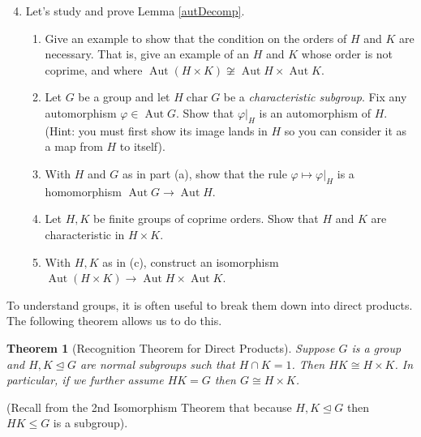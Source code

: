 \documentclass[11pt]{article}
\newtheorem{theorem}{Theorem}
\newcommand{\Aut}{\operatorname{Aut}}
\newcommand{\ch}{\operatorname{char}}
\begin{document}
\begin{enumerate}
  \setcounter{enumi}{3}
  \item{
  Let's study and prove Lemma \ref{autDecomp}.
  \begin{enumerate}
    \item{
    Give an example to show that the condition on the orders of $H$ and $K$ are necessary.  That is, give an example of an $H$ and $K$ whose order is not coprime, and where $\Aut(H\times K)\not\cong \Aut H\times\Aut K$.
    }
    \item{
    Let $G$ be a group and let $H\ch G$ be a \textit{characteristic subgroup}.  Fix any automorphism $\varphi\in\Aut G$. Show that $\varphi|_H$ is an automorphism of $H$.  (Hint: you must first show its image lands in $H$ so you can consider it as a map from $H$ to itself).
    }
    \item{
    With $H$ and $G$ as in part (a), show that the rule $\varphi\mapsto\varphi|_H$ is a homomorphism $\Aut G\to\Aut H$.
    }
    \item{
    Let $H,K$ be finite groups of coprime orders.  Show that $H$ and $K$ are characteristic in $H\times K$.
    }
    \item{
    With $H,K$ as in (c), construct an isomorphism $\Aut(H\times K)\to\Aut H\times\Aut K$.
    }
  \end{enumerate}
  }
\end{enumerate}
To understand groups, it is often useful to break them down into direct products.  The following theorem allows us to do this.
\begin{theorem}[Recognition Theorem for Direct Products]\label{recog}
Suppose $G$ is a group and $H,K\unlhd G$ are normal subgroups such that $H\cap K=1$.  Then $HK\cong H\times K$.  In particular, if we further assume $HK=G$ then $G\cong H\times K$.
\end{theorem}
(Recall from the 2nd Isomorphism Theorem that because $H,K\unlhd G$ then $HK\le G$ is a subgroup).
\end{document}
